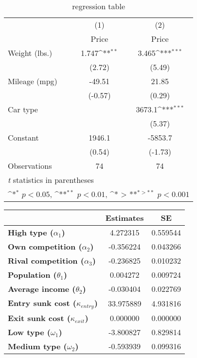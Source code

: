 \documentclass[UTF8]{ctexart}
\begin{document}
\begin{table}[htbp]\centering
\def\sym#1{\ifmmode^{#1}\else\(^{#1}\)\fi}
\caption{regression table}
\begin{tabular}{l*{2}{c}}
\hline\hline
                    &\multicolumn{1}{c}{(1)}&\multicolumn{1}{c}{(2)}\\
                    &\multicolumn{1}{c}{Price}&\multicolumn{1}{c}{Price}\\
\hline
Weight (lbs.)       &       1.747\sym{**} &       3.465\sym{***}\\
                    &      (2.72)         &      (5.49)         \\
[1em]
Mileage (mpg)       &      -49.51         &       21.85         \\
                    &     (-0.57)         &      (0.29)         \\
[1em]
Car type            &                     &      3673.1\sym{***}\\
                    &                     &      (5.37)         \\
[1em]
Constant            &      1946.1         &     -5853.7         \\
                    &      (0.54)         &     (-1.73)         \\
\hline
Observations        &          74         &          74         \\
\hline\hline
\multicolumn{3}{l}{\footnotesize \textit{t} statistics in parentheses}\\
\multicolumn{3}{l}{\footnotesize \sym{*} \(p<0.05\), \sym{**} \(p<0.01\), \sym{*
> **} \(p<0.001\)}\\
\end{tabular}
\end{table}

\begin{footnotesize}
\begin{tabular}{|l|c|c|}
\hline
&\textbf{Estimates}&\textbf{SE}\\\hline
\textbf{High type ($\alpha _{1}$)}&4.272315&0.559544\\\hline
\textbf{Own competition ($\alpha _{2}$)}&-0.356224&0.043266\\\hline
\textbf{Rival competition ($\alpha _{3}$)}&-0.236825&0.010232\\\hline
\textbf{Population ($\theta _{1}$)}&0.004272&0.009724\\\hline
\textbf{Average income ($\theta _{2}$)}&-0.030404&0.022769\\\hline
\textbf{Entry sunk cost ($\kappa _{entry}$)}&33.975889&4.931816\\\hline
\textbf{Exit sunk cost ($\kappa _{exit}$)}&0.000000&0.000000\\\hline
\textbf{Low type ($\omega _{1}$)}&-3.800827&0.829814\\\hline
\textbf{Medium type ($\omega _{2}$)}&-0.593939&0.099316\\\hline
\end{tabular}
\end{footnotesize}
\end{document}
